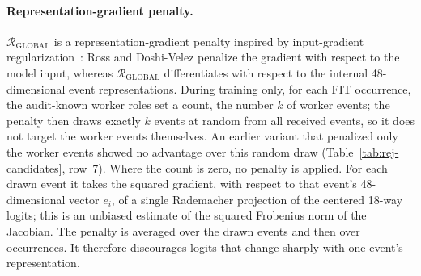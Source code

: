\paragraph{Representation-gradient penalty.}
$\mathcal{R}_{\mathrm{GLOBAL}}$ is a representation-gradient penalty
inspired by input-gradient regularization~\cite{ross2017improving}:
Ross and Doshi-Velez penalize the gradient with respect to the model
input, whereas $\mathcal{R}_{\mathrm{GLOBAL}}$ differentiates with
respect to the internal 48-dimensional event representations. During
training only, for each FIT occurrence, the audit-known worker roles
set a count, the
number $k$ of worker events; the penalty then draws exactly $k$ events
at random from all received events, so it does not target the worker
events themselves. An earlier variant that penalized only the worker events showed no
advantage over this random draw (Table~\ref{tab:rej-candidates},
row~7). Where the count is zero, no penalty is applied. For each drawn event it takes the
squared gradient, with respect to that event's 48-dimensional vector
$e_i$, of a single Rademacher projection of the centered 18-way logits;
this is an unbiased estimate of the squared Frobenius norm of the
Jacobian. The penalty is averaged over the drawn events and then over
occurrences. It therefore discourages logits that change sharply with one
event's representation.

